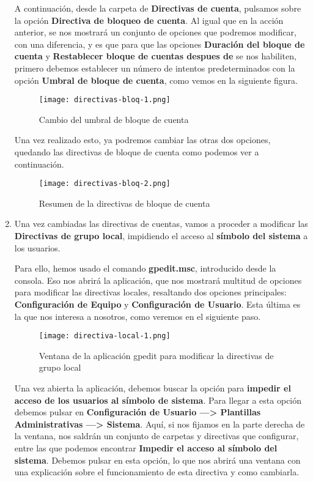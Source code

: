 \begin{enumerate}
    A continuación, desde la carpeta de \textbf{Directivas de cuenta}, pulsamos sobre la opción \textbf{Directiva de bloqueo de cuenta}. Al igual que en la acción anterior, se nos mostrará un conjunto de opciones que podremos modificar, con una diferencia, y es que para que las opciones \textbf{Duración del bloque de cuenta} y \textbf{Restablecer bloque de cuentas despues de} se nos habiliten, primero debemos establecer un número de intentos predeterminados con la opción \textbf{Umbral de bloque de cuenta}, como vemos en la siguiente figura.

    \begin{figure}[H]
        \centering
        \texttt{[image: directivas-bloq-1.png]}
        \caption{Cambio del umbral de bloque de cuenta}
    \end{figure}

    Una vez realizado esto, ya podremos cambiar las otras dos opciones, quedando las directivas de bloque de cuenta como podemos ver a continuación.

    \begin{figure}[H]
        \centering
        \texttt{[image: directivas-bloq-2.png]}
        \caption{Resumen de la directivas de bloque de cuenta}
    \end{figure}

    \item Una vez cambiadas las directivas de cuentas, vamos a proceder a modificar las \textbf{Directivas de grupo local}, impidiendo el acceso al \textbf{símbolo del sistema} a los usuarios.

    Para ello, hemos usado el comando \textbf{gpedit.msc}, introducido desde la consola. Eso nos abrirá la aplicación, que nos mostrará multitud de opciones para modificar las directivas locales, resaltando dos opciones principales: \textbf{Configuración de Equipo} y \textbf{Configuración de Usuario}. Esta última es la que nos interesa a nosotros, como veremos en el siguiente paso.

    \begin{figure}[H]
        \centering
        \texttt{[image: directiva-local-1.png]}
        \caption{Ventana de la aplicación gpedit para modificar la directivas de grupo local}
    \end{figure}

    Una vez abierta la aplicación, debemos buscar la opción para \textbf{impedir el acceso de los usuarios al símbolo de sistema}. Para llegar a esta opción debemos pulsar en \textbf{Configuración de Usuario ---> Plantillas Administrativas ---> Sistema}.  Aquí, si nos fijamos en la parte derecha de la ventana, nos saldrán un conjunto de carpetas y directivas que configurar, entre las que podemos encontrar \textbf{Impedir el acceso al símbolo del sistema}. Debemos pulsar en esta opción, lo que nos abrirá una ventana con una explicación sobre el funcionamiento de esta directiva y como cambiarla.


\end{enumerate}

